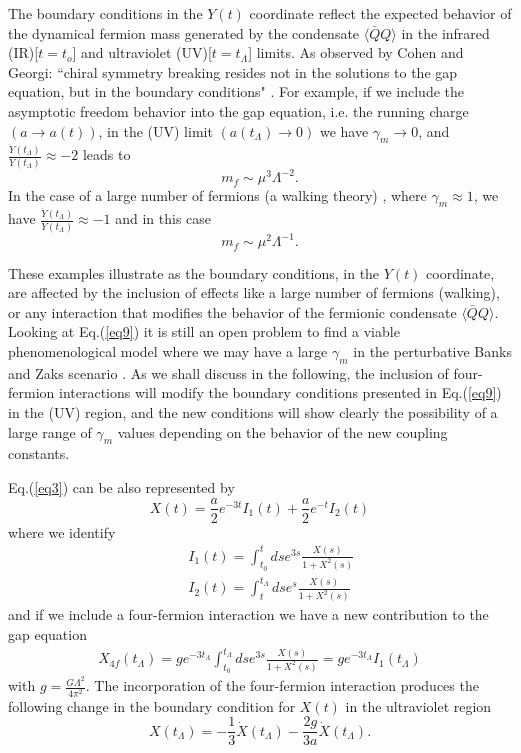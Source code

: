 \documentclass[preprint,amsmath,amssymb,superscriptaddress,showpacs,aps12pt]{revtex4}
\def\br{\begin{eqnarray}}
\def\er{\end{eqnarray}}
\def\be{\begin{equation}}
\def\ee{\end{equation}}
\begin{document}
\par The boundary conditions in the $Y(t)$ coordinate  reflect  the  expected behavior of the dynamical fermion  mass generated
 by the condensate $\langle \bar{Q} Q\rangle$ in the infrared (IR)[$t=t_o$] and ultraviolet (UV)[$t=t_{\Lambda}$] limits. As
observed by Cohen and Georgi: ``chiral symmetry breaking resides not in the solutions to the gap equation, but in
the boundary conditions" \cite{georgi}. For example, if we include the  asymptotic  freedom behavior into the gap equation, 
i.e. the running charge $(a \to a(t))$, in the (UV) limit  $(a(t_{\Lambda}) \to 0)$  we have  $\gamma_m \to 0$, and
$\frac{\dot{Y}(t_{\Lambda})}{Y(t_{\Lambda})} \approx -2$ leads to  
$$
m_f  \sim \mu^3\Lambda^{-2}. 
$$
In the case of a large number of fermions (a walking theory) , where $\gamma_m \approx 1$, we have 
$\frac{\dot{Y}(t_{\Lambda})}{Y(t_{\Lambda})} \approx -1$ and in this case 
$$
m_f \sim \mu^2\Lambda^{-1}. 
$$

\par These examples illustrate as  the boundary conditions, in the $Y(t)$ coordinate, are affected by the inclusion of effects like a large number of fermions (walking),  or any interaction that  modifies the behavior of the fermionic condensate $\langle \bar{Q} Q\rangle$. 
Looking at Eq.(\ref{eq9}) it is still an open problem to find a viable phenomenological model where we may have a large $\gamma_m$ in
the perturbative Banks and Zaks scenario \cite{BZ}. As we shall discuss in the following, the inclusion
of four-fermion interactions will modify the boundary conditions presented in Eq.(\ref{eq9}) in the (UV) region, and the new conditions will show clearly the possibility of a large range of $\gamma_m$ values depending on the behavior of the new coupling constants.
 
\par Eq.(\ref{eq3}) can be also represented by 
\be
X(t)=  \frac{a}{2}e^{-3t}I_1(t) + \frac{a}{2}e^{-t}I_2(t)
\label{eq10} 
\ee 
\noindent where we identify 
\br 
&& I_1(t) = \int^{t}_{t_0}dse^{3s}\frac{X(s)}{1+X^2(s)} \nonumber \\
&& I_2(t) =\int^{t_{\Lambda}}_{t}dse^{s}\frac{X(s)}{1+X^2(s)} \nonumber 
\er 
\noindent  and if we include a four-fermion interaction we have a new contribution to the gap equation 
\br 
X_{4f}(t_{\Lambda})=  ge^{-3t_{\Lambda}}\int^{t_{\Lambda}}_{t_0}dse^{3s}\frac{X(s)}{1+X^2(s)} = ge^{-3t_{\Lambda}}I_1(t_{\Lambda})
\er 
\noindent with $g = \frac{G\Lambda^2}{4\pi^2}$. The incorporation of the  four-fermion interaction produces the following change in the boundary condition for  $X(t)$ in  the ultraviolet region 
\be 
X(t_{\Lambda}) = -\frac{1}{3}\dot{X}(t_{\Lambda}) - \frac{2g}{3a}\dot{X}(t_{\Lambda}) .
\ee 
\end{document}
